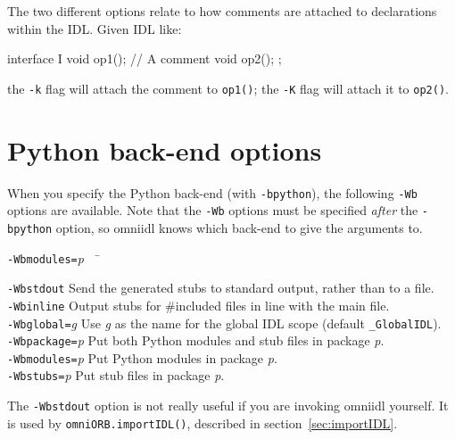 \documentclass[11pt,twoside,a4paper]{book}
\newcommand{\module}[1]{\texttt{#1}}
\newcommand{\op}[1]{\texttt{#1()}}
\newcommand{\cmdline}[1]{\texttt{#1}}
\begin{document}
The two different options relate to how comments are attached to
declarations within the IDL. Given IDL like:

\begin{idllisting}
interface I {
  void op1();
  // A comment
  void op2();
};
\end{idllisting}

\noindent the \cmdline{-k} flag will attach the comment to \op{op1};
the \cmdline{-K} flag will attach it to \op{op2}.



\section{Python back-end options}
\label{sec:Wbglobal}

When you specify the Python back-end (with \cmdline{-bpython}), the
following \cmdline{-Wb} options are available. Note that the
\cmdline{-Wb} options must be specified \emph{after} the
\cmdline{-bpython} option, so omniidl knows which back-end to give the
arguments to.


\begin{tabbing}

\cmdline{-Wbmodules=}\textit{p}~~ \= \kill

\cmdline{-Wbstdout}
     \> Send the generated stubs to standard output, rather than to a
        file.\\

\cmdline{-Wbinline}
     \> Output stubs for \#included files in line with the main
        file.\\

\cmdline{-Wbglobal=}\textit{g}
     \> Use \textit{g} as the name for the global IDL scope (default
        \module{\_GlobalIDL}).\\

\cmdline{-Wbpackage=}\textit{p}
     \> Put both Python modules and stub files in package
        \textit{p}.\\

\cmdline{-Wbmodules=}\textit{p}
     \> Put Python modules in package \textit{p}.\\

\cmdline{-Wbstubs=}\textit{p}
     \> Put stub files in package \textit{p}.\\

\end{tabbing}


The \cmdline{-Wbstdout} option is not really useful if you are
invoking omniidl yourself. It is used by \op{omniORB.importIDL},
described in section~\ref{sec:importIDL}.
\end{document}
